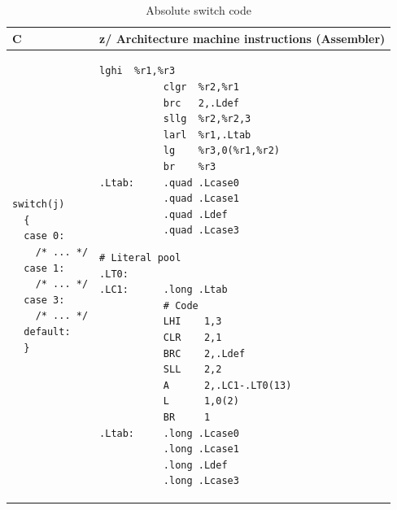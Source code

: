 \documentclass[USenglish,fontsize=11pt,twoside,%
  toc=bib,toc=idx,toc=graduated,numbers=noendperiod,
  bookmarks=true,
  bookmarksnumbered=true,
  bookmarksopen=true,
  bookmarksopenlevel=1,
  breaklinks=true,
  colorlinks=true,
  linkcolor=black,
  pdfpagelayout={TwoPageRight},
  pdfusetitle=true
]{scrreprt}
\newcommand{\ARCH}{z/\kern-1pt Ar\-chi\-tec\-ture}
\newcommand{\ARCH}{ESA/390}
\newenvironment{DIFnomarkup}{}{} %
\begin{document}
\begin{table}
  \centering
  \begin{DIFnomarkup}
  \begin{tabular}{p{}p{}}
    \toprule
    C & \ARCH{} machine instructions (Assembler) \\
    \midrule
\begin{lstlisting}[style=short]
switch(j)
  {
  case 0:
    /* ... */
  case 1:
    /* ... */
  case 3:
    /* ... */
  default:
  }
\end{lstlisting}
    &
\ifzseries
\begin{lstlisting}[style=short,language=simpleasm]
           lghi  %r1,%r3
           clgr  %r2,%r1
           brc   2,.Ldef
           sllg  %r2,%r2,3
           larl  %r1,.Ltab
           lg    %r3,0(%r1,%r2)
           br    %r3
.Ltab:     .quad .Lcase0
           .quad .Lcase1
           .quad .Ldef
           .quad .Lcase3
\end{lstlisting}
\else
\begin{lstlisting}[style=short,language=simpleasm]
           # Literal pool
.LT0:
.LC1:      .long .Ltab
           # Code
           LHI    1,3
           CLR    2,1
           BRC    2,.Ldef
           SLL    2,2
           A      2,.LC1-.LT0(13)
           L      1,0(2)
           BR     1
.Ltab:     .long .Lcase0
           .long .Lcase1
           .long .Ldef
           .long .Lcase3
\end{lstlisting}
\fi \\
    \bottomrule
  \end{tabular}
  \end{DIFnomarkup}
  \caption{Absolute switch code}
  \label{tab:absswitch}
\end{table}
\end{document}
